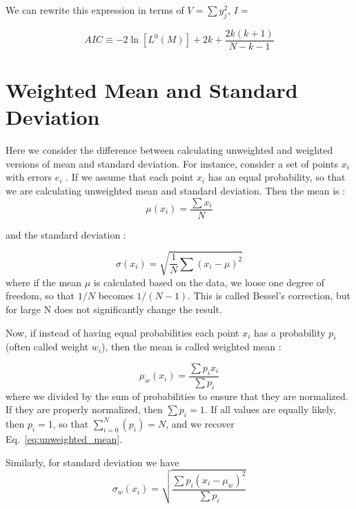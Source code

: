 \documentclass[fleqn,usenatbib]{mnras}  %
\begin{document}
We can rewrite this expression in terms of $V = \sum y_{j}^{2}$, $I = $



\begin{equation}
\label{eq:AIC_eq}
AIC \equiv -2 \ln[L^{0}(M)] + 2k + \frac{2k(k+1)}{N-k-1}
\end{equation}


\section{Weighted Mean and Standard Deviation}



Here we consider the difference between calculating unweighted and weighted versions of mean and standard deviation. For instance, consider a set of points $x_{i}$ with errors $e_{i}$ . If we assume that each point $x_{i}$ has an equal probability, so that we are calculating unweighted mean and standard deviation. Then the  mean is  :
\begin{equation}
\label{eq:unweighted_mean}
\mu(x_{i}) = \frac{\sum x_{i}}{N}
\end{equation}

and the standard deviation : 

\begin{equation}
\label{eq:unweighted_deviation}
\sigma(x_{i}) = \sqrt{\frac{1}{N} \sum{(x_{i} - \mu)^{2}}}
\end{equation}
where if the mean $\mu$ is calculated based on the data, we loose one degree of freedom, so that $1/N$ becomes $1/(N-1)$. This is called Bessel's correction, but for large N does not significantly change the result.  

Now, if instead of having equal probabilities each point $x_{i}$ has a probability $p_{i}$ (often called weight $w_{i}$), then the mean is  called weighted mean : 

\begin{equation}
\label{eq:weighted_mean}
\mu_{w}(x_{i}) = \frac{\sum p_{i} x_{i}}{\sum p_{i}}
\end{equation}
where we divided by the sum of probabilities to ensure that they are normalized. If they are properly normalized, then $\sum p_{i} = 1$. If all values are equally likely, then $p_{i} = 1$, so that $\sum_{i=0}^{N}(p_{i}) = N$, and we recover Eq.~\ref{eq:unweighted_mean}.

Similarly, for standard deviation we have 
\begin{equation}
\label{eq:weighted_deviation}
\sigma_{w}(x_{i}) = \sqrt{ \frac{\sum{p_{i}(x_{i} - \mu_{w})^{2}}}{\sum p_{i}} }
\end{equation}
\end{document}
